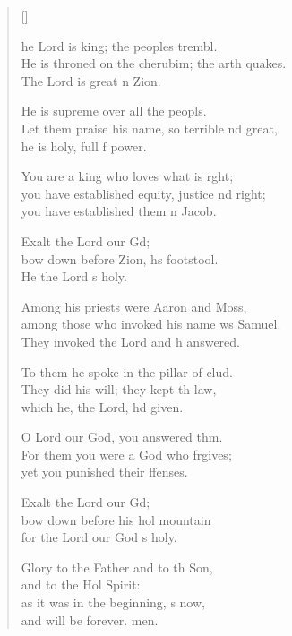 \settowidth{\versewidth}{He is throned on the cherubim; the earth quakes. *}
\begin{verse}[\versewidth]
  \begin{patverse}
he Lord is king; the peoples trembl.\Flex\\
He is throned on the cherubim; the arth quakes.\Med\\
The Lord is great \pointup{\i}n Zion.

He is supreme over all the peopls.\Flex\\
Let them praise his name, so terrible nd great,\Med\\
he is holy, full f power.

You are a king who loves what is r\pointup{\i}ght;\Flex\\
you have established equity, justice nd right;\Med\\
you have established them \pointup{\i}n Jacob.

Exalt the Lord our Gd;\Flex\\
bow down before Zion, h\pointup{\i}s footstool.\Med\\
He the Lord \pointup{\i}s holy.

Among his priests were Aaron and Moss,\Flex\\
among those who invoked his name ws Samuel.\Med\\
They invoked the Lord and h answered.

To them he spoke in the pillar of clud.\Flex\\
They did his will; they kept th law,\Med\\
which he, the Lord, hd given.

O Lord our God, you answered thm.\Flex\\
For them you were a God who frgives;\Med\\
yet you punished their ffenses.

Exalt the Lord our Gd;\Flex\\
bow down before his hol mountain\Med\\
for the Lord our God \pointup{\i}s holy.

Glory to the Father and to th Son,\Med\\
and to the Hol Spirit:\\
as it was in the beginning, \pointup{\i}s now,\Med\\
and will be forever. men.
  \end{patverse}
\end{verse}
